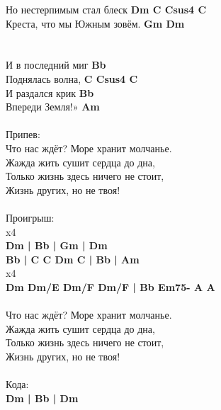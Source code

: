 Но нестерпимым стал блеск		\textbf{Dm C Csus4 C}\\
Креста, что мы Южным зовём.		\textbf{Gm Dm}\\
\\
         \\
И в последний миг			\textbf{Bb}\\
Поднялась волна,			\textbf{C Csus4 C}\\
И раздался крик				\textbf{Bb}\\
Впереди Земля!»				\textbf{Am}\\
\\
Припев:\\
Что нас ждёт? Море хранит молчанье.\\
Жажда жить сушит сердца до дна,\\
Только жизнь здесь ничего не стоит,\\
Жизнь других, но не твоя!\\
\\
Проигрыш:\\
x4\\
\textbf{Dm | Bb | Gm | Dm}\\
\textbf{Bb | C C Dm C | Bb | Am}\\
x4\\
\textbf{Dm Dm/E Dm/F Dm/F | Bb Em75- A A}\\
\\
Что нас ждёт? Море хранит молчанье.\\
Жажда жить сушит сердца до дна,\\
Только жизнь здесь ничего не стоит,\\
Жизнь других, но не твоя!\\
\\
Кода: \\
\textbf{Dm | Bb | Dm}\\
\newpage


